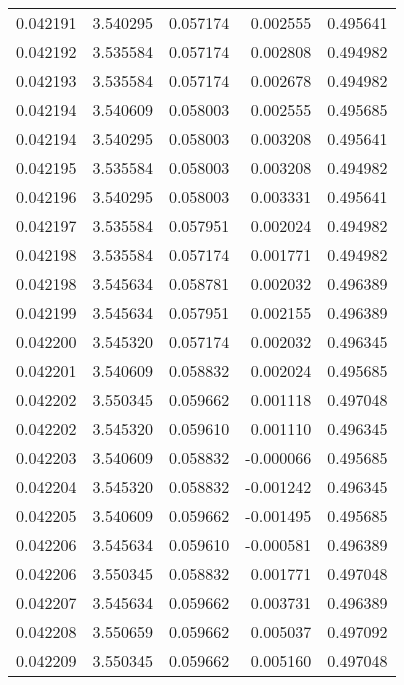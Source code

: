 \begin{tabular}{lrrrr}
0.042191    &  3.540295 &  0.057174 &  0.002555 &             0.495641 \\
0.042192    &  3.535584 &  0.057174 &  0.002808 &             0.494982 \\
0.042193    &  3.535584 &  0.057174 &  0.002678 &             0.494982 \\
0.042194    &  3.540609 &  0.058003 &  0.002555 &             0.495685 \\
0.042194    &  3.540295 &  0.058003 &  0.003208 &             0.495641 \\
0.042195    &  3.535584 &  0.058003 &  0.003208 &             0.494982 \\
0.042196    &  3.540295 &  0.058003 &  0.003331 &             0.495641 \\
0.042197    &  3.535584 &  0.057951 &  0.002024 &             0.494982 \\
0.042198    &  3.535584 &  0.057174 &  0.001771 &             0.494982 \\
0.042198    &  3.545634 &  0.058781 &  0.002032 &             0.496389 \\
0.042199    &  3.545634 &  0.057951 &  0.002155 &             0.496389 \\
0.042200    &  3.545320 &  0.057174 &  0.002032 &             0.496345 \\
0.042201    &  3.540609 &  0.058832 &  0.002024 &             0.495685 \\
0.042202    &  3.550345 &  0.059662 &  0.001118 &             0.497048 \\
0.042202    &  3.545320 &  0.059610 &  0.001110 &             0.496345 \\
0.042203    &  3.540609 &  0.058832 & -0.000066 &             0.495685 \\
0.042204    &  3.545320 &  0.058832 & -0.001242 &             0.496345 \\
0.042205    &  3.540609 &  0.059662 & -0.001495 &             0.495685 \\
0.042206    &  3.545634 &  0.059610 & -0.000581 &             0.496389 \\
0.042206    &  3.550345 &  0.058832 &  0.001771 &             0.497048 \\
0.042207    &  3.545634 &  0.059662 &  0.003731 &             0.496389 \\
0.042208    &  3.550659 &  0.059662 &  0.005037 &             0.497092 \\
0.042209    &  3.550345 &  0.059662 &  0.005160 &             0.497048 \\

\end{tabular}
